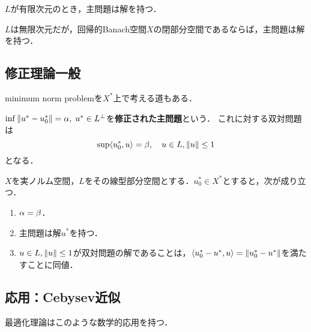 \documentclass[uplatex,dvipdfmx]{jsreport}
\begin{document}
\begin{corollary}
    $L$が有限次元のとき，主問題は解を持つ．
\end{corollary}

\begin{remark}
    $L$は無限次元だが，回帰的Banach空間$X$の閉部分空間であるならば，主問題は解を持つ．
\end{remark}

\subsection{修正理論一般}

\begin{tcolorbox}[colframe=ForestGreen, colback=ForestGreen!10!white,breakable,colbacktitle=ForestGreen!40!white,coltitle=black,fonttitle=\bfseries\sffamily,
title=]
    minimum norm problemを$X^*$上で考える道もある．
\end{tcolorbox}

\begin{definition}
    $\inf\|u^*-u_0^*\|=\alpha,\;u^*\in L^\perp$を\textbf{修正された主問題}という．
    これに対する双対問題は
    \[\sup\langle u^*_0,u\rangle=\beta,\quad u\in L,\|u\|\le 1\]
    となる．
\end{definition}

\begin{theorem}
    $X$を実ノルム空間，$L$をその線型部分空間とする．$u_0^*\in X^*$とすると，次が成り立つ．
    \begin{enumerate}
        \item $\alpha=\beta$．
        \item 主問題は解$u^*$を持つ．
        \item $u\in L,\|u\|\le 1$が双対問題の解であることは，$\langle u_0^*-u^*,u\rangle=\|u^*_0-u^*\|$を満たすことに同値．
    \end{enumerate}
\end{theorem}

\subsection{応用：Cebysev近似}

\begin{tcolorbox}[colframe=ForestGreen, colback=ForestGreen!10!white,breakable,colbacktitle=ForestGreen!40!white,coltitle=black,fonttitle=\bfseries\sffamily,
title=]
    最適化理論はこのような数学的応用を持つ．
\end{tcolorbox}
\end{document}

